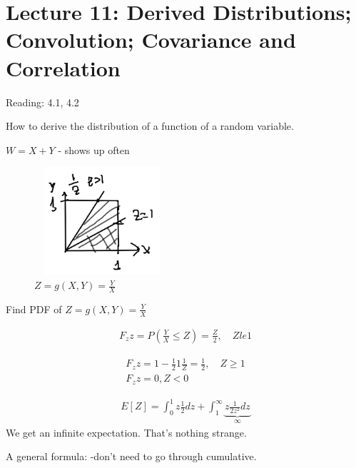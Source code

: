 \documentclass{article}
\begin{document}

\section{Lecture 11: Derived Distributions; Convolution; Covariance and Correlation}

Reading: 4.1, 4.2

How to derive the distribution of a function of a random variable.

$W=X+Y$ - shows up often

\begin{figure}[h]
\centering
\includegraphics[width=5cm, height=4cm]{images/L11/derived_dist_z.jpeg}
\caption{$Z=g(X,Y)=\frac{Y}{X}$}
\end{figure}

Find PDF of $Z=g(X,Y)=\frac{Y}{X}$

\begin{align*}
F_z{z}=P \left(\frac{Y}{X} \le Z \right) = \frac{Z}{2},\quad Z le 1
\end{align*}

\begin{align*}
F_z{z}= 1 - \frac{1}{2}1\frac{1}{Z} = \frac{1}{2},\quad Z \ge 1\\
F_z{z}= 0, Z < 0
\end{align*}

\begin{align*}
E[Z] = \int_0^1 z \frac{1}{2}dz + \int_1^{\infty} \underbrace{z \frac{1}{2 z^2}dz}_{\infty}
\end{align*}
We get an infinite expectation.  That's nothing strange.


A general formula: -don't need to go through cumulative.
\end{document}
